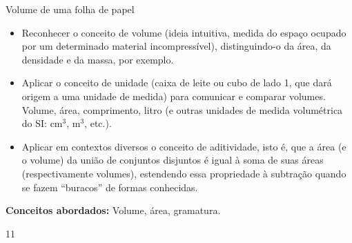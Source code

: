 \def\currentcolor{session1}
\begin{objectives}{Volume de uma folha de papel}
{
\begin{itemize}
\item {} 
Reconhecer o conceito de volume (ideia intuitiva, medida do espaço ocupado por um determinado material incompressível), distinguindo-o da área, da densidade e da massa, por exemplo.

\item {} 
Aplicar o conceito de unidade (caixa de leite ou cubo de lado 1, que dará origem a uma unidade de medida) para comunicar e comparar volumes. Volume, área, comprimento, litro (e outras unidades de medida volumétrica do SI: cm\(^3\), m\(^3\), etc.).

\item {} 
Aplicar em contextos diversos o conceito de aditividade, isto é, que a área (e o volume) da união de conjuntos disjuntos é igual à soma de suas áreas (respectivamente volumes), estendendo essa propriedade à subtração quando se fazem “buracos” de formas conhecidas.

\end{itemize}

\textbf{Conceitos abordados:} Volume, área, gramatura.
}{1}{1}
\end{objectives}
